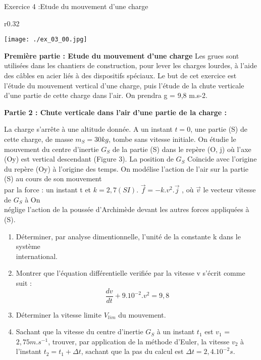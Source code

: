 \documentclass[12pt, french]{article}
\begin{document}
\begin{Box2}{Exercice 4 :Etude du mouvement d’une charge }
	\begin{wrapfigure}[13]{r}{0.32\textwidth}
  \begin{center}
	  \vspace{-0.6cm}
	\texttt{[image: ./ex\_03\_00.jpg]}
  \end{center}
\end{wrapfigure}


	\textbf{Première partie : Etude du mouvement d’une charge }
Les grues sont utilisées dans les chantiers de construction, pour lever les charges
lourdes, à l’aide des câbles en acier liés à des dispositifs spéciaux.
Le but de cet exercice est l’étude du mouvement
vertical d’une charge, puis l’étude de la chute
verticale d’une partie de cette charge dans l’air.
On prendra g = 9,8 m.s-2.

\textbf{Partie 2 : Chute verticale dans l’air d’une partie de
la charge :}

La charge s’arrête à une altitude donnée. A un
instant $t = 0$, une partie (S) de cette charge, de
masse $m_S = 30 kg$, tombe sans vitesse initiale.
On étudie le mouvement du centre d’inertie $G_S$
de la partie (S) dans
le repère (O, j) où l’axe (Oy) est vertical
descendant (Figure 3).
La position de $G_S$ Coïncide avec l’origine du repère (Oy) à l’origine
des temps.
On modélise l’action de l’air sur la partie (S) au cours de son
mouvement \\par la force :
un instant t et $k = 2,7 (SI)$. $\vec{f} = -k.v^2 .\vec{j}$ , où $\vec{v}$ le vecteur vitesse de $G_S$ à
On \\néglige l’action de la poussée d’Archimède devant les autres
forces appliquées à (S).

\begin{enumerate}

	\item Déterminer, par analyse dimentionnelle, l’unité de la
constante k dans le système \\international.

\item Montrer que l’équation différentielle verifiée par la vitesse v s’écrit comme suit : $$\frac{dv}{dt}+9.10^{-2}.v^2 = 9,8$$

\item Déterminer la vitesse limite $V_{lim}$ du mouvement.
\item Sachant que la vitesse du centre d’inertie $G_S$ à un instant $t_1$ est $v_1$ =$2,75 m.s^{-1}$,
trouver, par application de la méthode d’Euler, la vitesse $v_2$ à l’instant
$t_2 = t_1 + \Delta{t}$, sachant que la pas du calcul est $\Delta{t} = 2,4.10^{-2}s$.

\end{enumerate}
\end{Box2}
\end{document}
